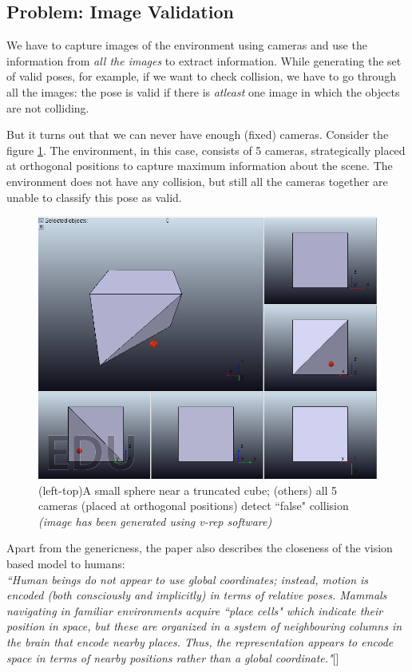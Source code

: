 \documentclass[12pt]{article}
\begin{document}
\subsection{Problem: Image Validation}
We have to capture images of the environment using cameras and use the information from \textit{all the images} to extract information. While generating the set of valid poses, for example, if we want to check collision, we have to go through all the images: the pose is valid if there is \textit{atleast} one image in which the objects are not colliding.

But it turns out that we can never have enough (fixed) cameras. Consider the figure \ref{difficulties}. The environment, in this case, consists of 5 cameras, strategically placed at orthogonal positions to capture maximum information about the scene. The environment does not have any collision, but still all the cameras together are unable to classify this pose as valid.\\
\begin{figure}
  \includegraphics[width=\columnwidth]{graphics/difficulties}
  \caption{(left-top)A small sphere near a truncated cube; (others) all 5 cameras (placed at orthogonal positions) detect ``false" collision \textit{\small{(image has been generated using v-rep software)}}}
  \label{difficulties}
\end{figure}

Apart from the genericness, the paper also describes the closeness of the vision based model to humans:\\
\textit{``Human beings do not appear to use global coordinates; instead, motion is encoded (both consciously and implicitly) in terms of relative poses. Mammals navigating in familiar environments acquire ``place cells" which indicate their position in space, but these are organized in a system of neighbouring columns in the brain that encode nearby places. Thus, the representation appears to encode space in terms of nearby positions rather than a global coordinate."}[\cite{deb}]
\end{document}
